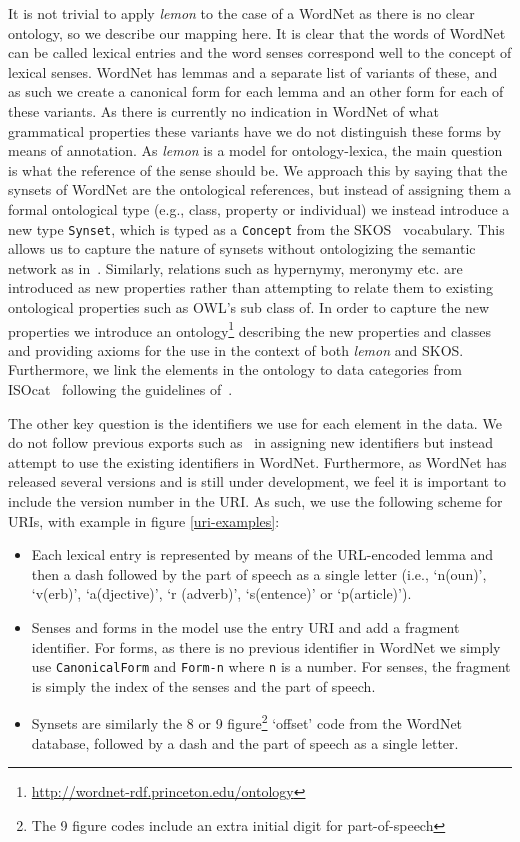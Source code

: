 \documentclass[10pt, a4paper]{article}
\newcommand{\lemon}[0]{\emph{lemon}}
\begin{document}
It is not trivial to apply \lemon{} to the case of a WordNet as there is no
clear ontology, so we describe our mapping here.
It is clear that the
words of WordNet can be called lexical entries and the word senses correspond
well to the concept of lexical senses. WordNet has lemmas and a separate list of
variants of these, and as such we create a canonical form for each lemma and an
other form for each of these variants. As there is currently no indication in
WordNet of what grammatical properties these variants have we do not distinguish
these forms by means of annotation. As \lemon{} is a model for
ontology-lexica, the main question is what the reference of the sense should be.
We approach this by saying that the synsets of WordNet are the ontological
references, but instead of assigning them a formal ontological type (e.g.,
class, property or individual) we instead introduce a new type {\tt Synset},
which is typed as a {\tt Concept} from the SKOS~\cite{miles2007skos} vocabulary.
This allows us to capture the nature of synsets without
ontologizing the semantic network as in~\cite{gangemi2003ontowordnet}.
Similarly, relations such as hypernymy, meronymy etc. are introduced as new
properties rather than attempting to relate them to existing ontological
properties such as OWL's sub class of. In order to capture the new properties we
introduce an ontology\footnote{\url{http://wordnet-rdf.princeton.edu/ontology}}
describing the new properties and classes and providing
axioms for the use in the context of both \lemon{} and SKOS. Furthermore, we
link the elements in the ontology to data categories from
ISOcat~\cite{kemps2008isocat} following the guidelines
of~\cite{windhouwer2012linking}.

The other key question is the identifiers we use for each element in the data.
We do not follow previous exports such as~\cite{van2006conversion} in assigning new identifiers
but instead attempt to use the existing identifiers in WordNet. Furthermore, as
WordNet has released several versions and is still under development, we feel it
is important to include the version number in the URI. As such, we use the
following scheme for URIs, with example in figure \ref{uri-examples}:

\begin{itemize}
  \item Each lexical entry is represented by means of the URL-encoded lemma and
    then a dash followed by the part of speech as a single letter (i.e., `n(oun)',
    `v(erb)', `a(djective)', `r (adverb)', `s(entence)' or `p(article)').
  \item Senses and forms in the model use the entry URI and add a fragment
    identifier. For forms, as there is no previous identifier in WordNet we
    simply use {\tt CanonicalForm} and {\tt Form-n} where {\tt n} is a number.
    For senses, the fragment is simply the index of the senses and the part of
    speech.
  \item Synsets are similarly the 8 or 9 figure\footnote{The 9 figure codes
      include an extra initial digit for part-of-speech} `offset' code from the WordNet
    database, followed by a dash and the part of speech as a single letter.
\end{itemize}
\end{document}

